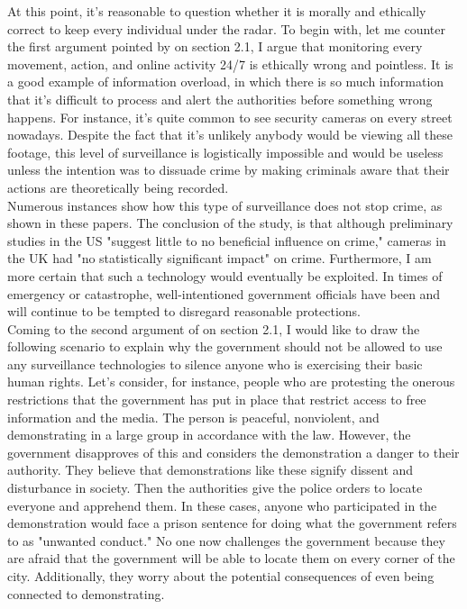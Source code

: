 \documentclass[11pt]{report}
\begin{document}
At this point, it's reasonable to question whether it is morally and ethically correct to keep every individual under the radar. To begin with, let me counter the first argument pointed by \cite{tyler} on section 2.1, I argue that monitoring every movement, action, and online activity 24/7 is ethically wrong and pointless. It is a good example of information overload, in which there is so much information that it's difficult to process and alert the authorities before something wrong happens. For instance, it's quite common to see security cameras on every street nowadays. Despite the fact that it's unlikely anybody would be viewing all these footage, this level of surveillance is logistically impossible and would be useless unless the intention was to dissuade crime by making criminals aware that their actions are theoretically being recorded.\\

Numerous instances show how this type of surveillance does not stop crime, as shown in these papers\cite{martin_et_al}\cite{Noam_et_al}. The conclusion of the study, \cite{Noam_et_al} is that although preliminary studies in the US "suggest little to no beneficial influence on crime," cameras in the UK had "no statistically significant impact" on crime. Furthermore, I am more certain that such a technology would eventually be exploited. In times of emergency or catastrophe, well-intentioned government officials have been and will continue to be tempted to disregard reasonable protections.\\

Coming to the second argument of \cite{tyler} on section 2.1, I would like to draw the following scenario to explain why the government should not be allowed to use any surveillance technologies to silence anyone who is exercising their basic human rights. Let's consider, for instance, people who are protesting the onerous restrictions that the government has put in place that restrict access to free information and the media. The person is peaceful, nonviolent, and demonstrating in a large group in accordance with the law. However, the government disapproves of this and considers the demonstration a danger to their authority. They believe that demonstrations like these signify dissent and disturbance in society. Then the authorities give the police orders to locate everyone and apprehend them. In these cases, anyone who participated in the demonstration would face a prison sentence for doing what the government refers to as "unwanted conduct." No one now challenges the government because they are afraid that the government will be able to locate them on every corner of the city. Additionally, they worry about the potential consequences of even being connected to demonstrating.\\
\end{document}
